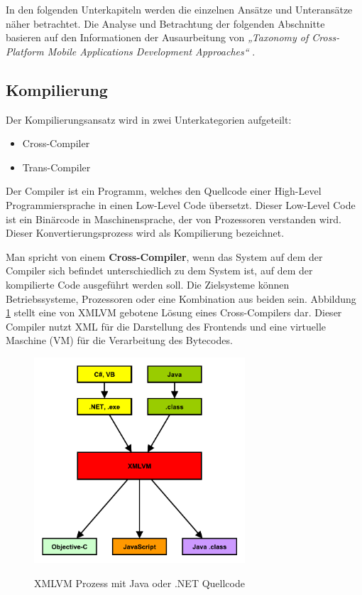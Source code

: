 In den folgenden Unterkapiteln werden die einzelnen Ansätze und Unteransätze näher betrachtet. Die Analyse und Betrachtung der folgenden Abschnitte basieren auf den Informationen der Ausaurbeitung von \textit{„Taxonomy of Cross-Platform Mobile Applications Development Approaches“} \citep{cross_plattform_approaches}.

\subsection{Kompilierung}
Der Kompilierungsansatz wird in zwei Unterkategorien aufgeteilt:

\begin{itemize}
	\item Cross-Compiler
	\item Trans-Compiler
\end{itemize}

Der Compiler ist ein Programm, welches den Quellcode einer High-Level Programmiersprache in einen Low-Level Code übersetzt. Dieser Low-Level Code ist ein Binärcode in Maschinensprache, der von Prozessoren verstanden wird. Dieser Konvertierungsprozess wird als Kompilierung bezeichnet.

\bigskip
Man spricht von einem \textbf{Cross-Compiler}, wenn das System auf dem der Compiler sich befindet unterschiedlich zu dem System ist, auf dem der kompilierte Code ausgeführt werden soll. Die Zielsysteme können Betriebssysteme, Prozessoren oder eine Kombination aus beiden sein. Abbildung \ref{graph_compilation_XMLVM} stellt eine von XMLVM gebotene Lösung eines Cross-Compilers dar. Dieser Compiler nutzt XML für die Darstellung des Frontends und eine virtuelle Maschine (VM) für die Verarbeitung des Bytecodes.

\begin{figure}[htbp]
	\centering
	\includegraphics[width=0.7\textwidth]{Bilder/Compilation_Cross_XMLVM}
	\caption{XMLVM Prozess mit Java oder .NET Quellcode}\label{graph_compilation_XMLVM}\citep{XMLVM_Toolchain}
\end{figure}


